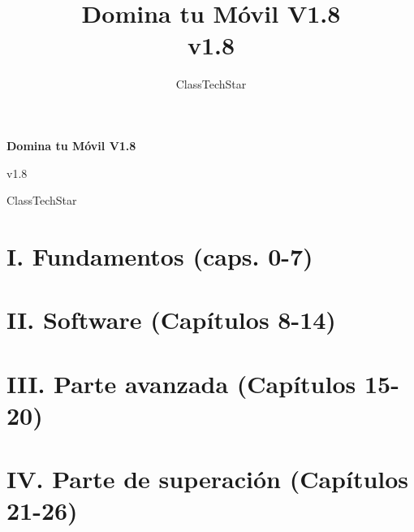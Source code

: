 \documentclass[11pt,a4paper,openany]{book}
\title{Domina tu Móvil V1.8\\ \large v1.8}
\author{ClassTechStar}
\date{}
\begin{document}
\begin{titlepage}
\centering
\vspace*{0.28\textheight}
{\Huge\bfseries Domina tu Móvil V1.8\par}
\vspace{1.2em}
{\Large v1.8\par}
\vfill
{\large ClassTechStar\par}
\end{titlepage}
\frontmatter
\tableofcontents
\mainmatter
\part*{I. Fundamentos (caps. 0-7)}










\part*{II. Software (Capítulos 8-14)}








\part*{III. Parte avanzada (Capítulos 15-20)}







\part*{IV. Parte de superación (Capítulos 21-26)}







\end{document}
